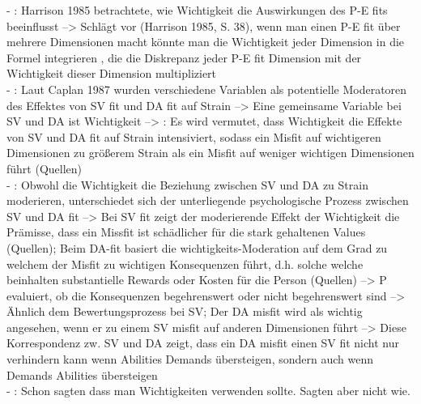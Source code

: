 \newpage
- \cite[S. 23f.]{edwards:2008}: Harrison 1985 betrachtete, wie Wichtigkeit die Auswirkungen des P-E fits beeinflusst --> Schlägt vor (Harrison 1985, S. 38), wenn man einen P-E fit über mehrere Dimensionen macht könnte man die Wichtigkeit jeder Dimension in die Formel integrieren , die die Diskrepanz jeder P-E fit Dimension mit der Wichtigkeit dieser Dimension multipliziert \\
- \cite[S. 9]{edwards:1996}: Laut Caplan 1987 wurden verschiedene Variablen als potentielle Moderatoren des Effektes von SV fit und DA fit auf Strain --> Eine gemeinsame Variable bei SV und DA ist Wichtigkeit --> \cite[S. 10]{edwards:1996}: Es wird vermutet, dass Wichtigkeit die Effekte von SV und DA fit auf Strain intensiviert, sodass ein Misfit auf wichtigeren Dimensionen zu größerem Strain als ein Misfit auf weniger wichtigen Dimensionen führt (Quellen)\\
- \cite[S. 10]{edwards:1996}: Obwohl die Wichtigkeit die Beziehung zwischen SV und DA zu Strain moderieren, unterschiedet sich der unterliegende psychologische Prozess zwischen SV und DA fit --> Bei SV fit zeigt der moderierende Effekt der Wichtigkeit die Prämisse, dass ein Missfit ist schädlicher für die stark gehaltenen Values (Quellen); Beim DA-fit basiert die wichtigkeits-Moderation auf dem Grad zu welchem der Misfit zu wichtigen Konsequenzen führt, d.h. solche welche beinhalten substantielle Rewards oder Kosten für die Person (Quellen) --> P evaluiert, ob die Konsequenzen begehrenswert oder nicht begehrenswert sind --> Ähnlich dem Bewertungsprozess bei SV; Der DA misfit wird als wichtig angesehen, wenn er zu einem SV misfit auf anderen Dimensionen führt --> Diese Korrespondenz zw. SV und DA zeigt, dass ein DA misfit einen SV fit nicht nur verhindern kann wenn Abilities Demands übersteigen, sondern auch wenn Demands Abilities übersteigen \\
- \cite[S. 20f.]{edwards:2008}: Schon \textcite{copingAndAdaption:1974} sagten dass man Wichtigkeiten verwenden sollte. Sagten aber nicht wie.


